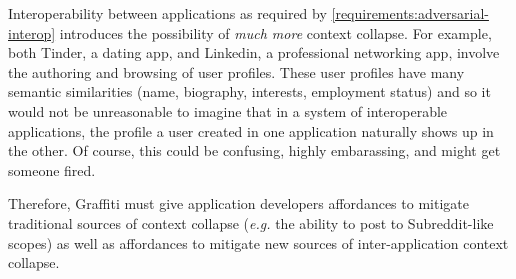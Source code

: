 Interoperability between applications as required by \ref{requirements:adversarial-interop} introduces the possibility
of \emph{much more} context collapse.
For example, both Tinder, a dating app, and Linkedin, a professional networking app, involve the authoring
and browsing of user profiles.
These user profiles have many semantic similarities (name, biography, interests, employment status) and so
it would not be unreasonable to imagine that in a system of interoperable applications,
the profile a user created in one application
naturally shows up in the other.
Of course, this could be confusing, highly embarassing, and might get someone fired.

Therefore, Graffiti must give application developers affordances to mitigate traditional sources
of context collapse (\emph{e.g.} the ability to post to Subreddit-like scopes)
as well as affordances to mitigate new sources of inter-application context collapse.





